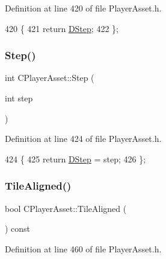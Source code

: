 Definition at line 420 of file Player\+Asset.\+h.


\begin{DoxyCode}
420                         \{
421             \textcolor{keywordflow}{return} \hyperlink{classCPlayerAsset_a7964d2161d51b3edd66fbc9c59eba4b0}{DStep};  
422         \};
\end{DoxyCode}
\hypertarget{classCPlayerAsset_aaa8c5b62f8c2c3bf05443c88e1619517}{}\label{classCPlayerAsset_aaa8c5b62f8c2c3bf05443c88e1619517} 
\subsubsection{\texorpdfstring{Step()}{Step()}\hspace{0.1cm}{\footnotesize\ttfamily [2/2]}}
{\footnotesize\ttfamily int C\+Player\+Asset\+::\+Step (\begin{DoxyParamCaption}\item[{int}]{step }\end{DoxyParamCaption})\hspace{0.3cm}{\ttfamily [inline]}}



Definition at line 424 of file Player\+Asset.\+h.


\begin{DoxyCode}
424                           \{
425             \textcolor{keywordflow}{return} \hyperlink{classCPlayerAsset_a7964d2161d51b3edd66fbc9c59eba4b0}{DStep} = step;  
426         \};
\end{DoxyCode}
\hypertarget{classCPlayerAsset_aaaea60176986f3e4f464bf5cec056521}{}\label{classCPlayerAsset_aaaea60176986f3e4f464bf5cec056521} 
\subsubsection{\texorpdfstring{Tile\+Aligned()}{TileAligned()}}
{\footnotesize\ttfamily bool C\+Player\+Asset\+::\+Tile\+Aligned (\begin{DoxyParamCaption}{ }\end{DoxyParamCaption}) const\hspace{0.3cm}{\ttfamily [inline]}}



Definition at line 460 of file Player\+Asset.\+h.



